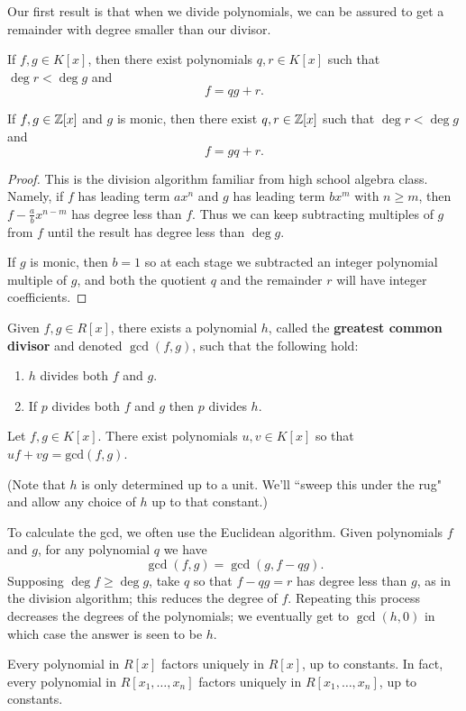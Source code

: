 Our first result is that when we divide polynomials, we can be assured to get a remainder with degree smaller than our divisor.
\begin{thm}\label{dwr}
If $f,g\in K[x]$, then there exist polynomials $q,r\in K[x]$ such that $\deg r<\deg g$ and
\[f=qg+r.\]

If $f,g\in \mathbb{Z}[x]$ and $g$ is monic, then there exist $q,r\in \mathbb{Z}[x]$ such that $\deg r<\deg g$ and
\[f=gq+r.\]
\end{thm}
\begin{proof}
This is the division algorithm familiar from high school algebra class. Namely, if $f$ has leading term $ax^n$ and $g$ has leading term $bx^m$ with $n\geq m$, then $f-\frac{a}{b}x^{n-m}$ has degree less than $f$. Thus we can keep subtracting multiples of $g$ from $f$ until the result has degree less than $\deg g$.

If $g$ is monic, then $b=1$ so at each stage we subtracted an integer polynomial multiple of $g$, and both the quotient $q$ and the remainder $r$ will have integer coefficients.
\end{proof}

\begin{thm}[B\'{e}zout]
Given $f,g\in R[x]$, there exists a polynomial $h$, called the \textbf{greatest common divisor} and denoted $\gcd(f,g)$, such that the following hold:
\begin{enumerate}
\item
$h$ divides both $f$ and $g$.
\item
If $p$ divides both $f$ and $g$ then $p$ divides $h$.
\end{enumerate}

Let $f,g\in K[x]$. There exist polynomials $u,v\in K[x]$ so that $uf+vg=\text{gcd}(f,g)$.
\end{thm}
(Note that $h$ is only determined up to a unit. We'll ``sweep this under the rug" and allow any choice of $h$ up to that constant.)

To calculate the gcd, we often use the Euclidean algorithm. Given polynomials $f$ and $g$, for any polynomial $q$ we have
\[
\gcd(f,g)=\gcd(g,f-qg).
\]
Supposing $\deg f\geq \deg g$, take $q$ so that $f-qg=r$ has degree less than $g$, as in the division algorithm; this reduces the degree of $f$. Repeating this process decreases the degrees of the polynomials; we eventually get to $\gcd(h,0)$ in which case the answer is seen to be $h$.

\begin{thm}
Every polynomial in $R[x]$ factors uniquely in $R[x]$, up to constants. In fact, every polynomial in $R[x_1,\ldots, x_n]$ factors uniquely in $R[x_1,\ldots, x_n]$, up to constants.
\end{thm}

